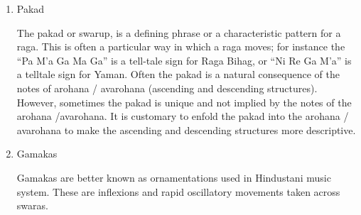 \begin{enumerate}
  \par
  \item Pakad \par
  The pakad or swarup, is a defining phrase or a characteristic pattern for a raga.  This is often a particular way in which a raga moves; for instance the ``Pa M'a Ga Ma Ga'' is a tell-tale sign for Raga Bihag, or ``Ni Re Ga M'a'' is a telltale sign for Yaman.  Often the pakad is a natural consequence of the notes of arohana / avarohana (ascending and descending structures).  However, sometimes the pakad is unique and not implied by the notes of the arohana /avarohana.  It is customary to enfold the pakad into the arohana / avarohana to make the ascending and descending structures more descriptive.
  \par
  \item Gamakas \par
  Gamakas are better known as ornamentations used in Hindustani music system. These are inflexions and rapid oscillatory movements taken across swaras.
\end{enumerate}
\par

